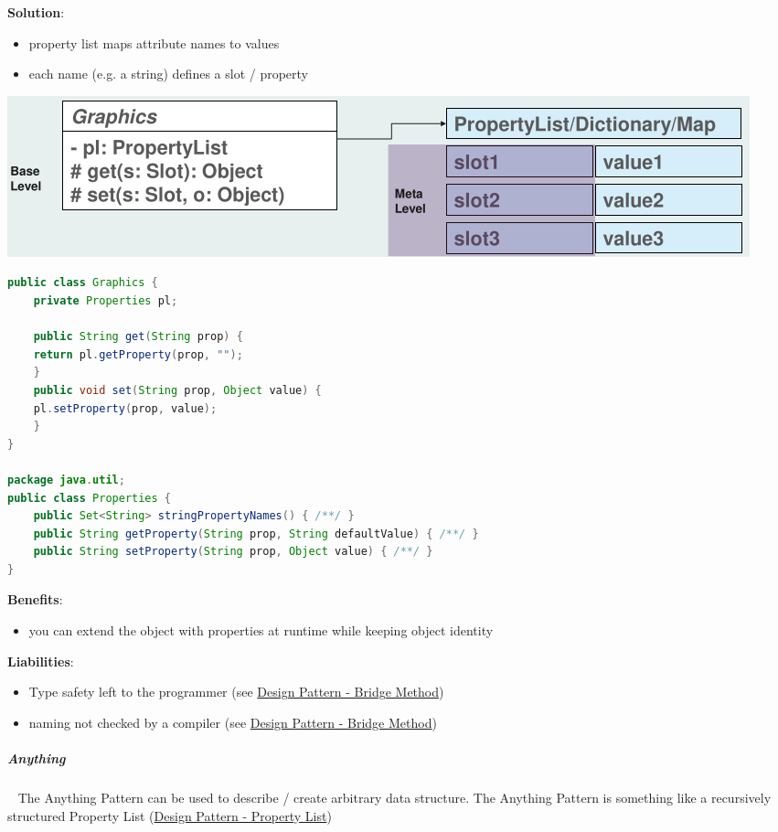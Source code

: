\documentclass[11pt,twoside,landscape]{article}
\begin{document}
\begin{multicols}{3}
\textbf{Solution}:
\begin{itemize}
\item property list maps attribute names to values
\item each name (e.g. a string) defines a slot / property
\end{itemize}

{
\begin{center}
\includegraphics[width=.9\linewidth]{img/property_list_example.png}
\end{center}
\label{fig:property-list-example}
}

\begin{lstlisting}[language=java,label=lst:example-for-anything,caption={Example for Anything},captionpos=b,numbers=none]
public class Graphics {
    private Properties pl;

    public String get(String prop) {
	return pl.getProperty(prop, "");
    }
    public void set(String prop, Object value) {
	pl.setProperty(prop, value);
    }
}

package java.util;
public class Properties {
    public Set<String> stringPropertyNames() { /**/ }
    public String getProperty(String prop, String defaultValue) { /**/ }
    public String setProperty(String prop, Object value) { /**/ }
}
\end{lstlisting}


\textbf{Benefits}:
\begin{itemize}
\item you can extend the object with properties at runtime while keeping object identity
\end{itemize}


\textbf{Liabilities}:
\begin{itemize}
\item Type safety left to the programmer (see \href{../../../roam/20230115180651-design_pattern_bridge_method.org}{Design Pattern - Bridge Method})
\item naming not checked by a compiler (see \href{../../../roam/20230115180651-design_pattern_bridge_method.org}{Design Pattern - Bridge Method})
\end{itemize}
\subparagraph{Anything} \
\label{sec:org7bf322d}
The Anything Pattern can be used to describe / create arbitrary data structure.
The Anything Pattern is something like a recursively structured Property List (\href{../../../roam/20230115171958-design_pattern_property_list.org}{Design Pattern - Property List})


\end{multicols}
\end{document}
